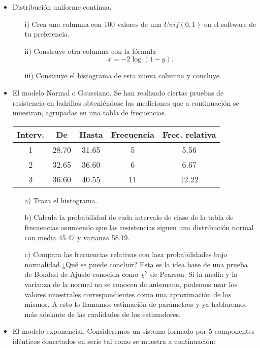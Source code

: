 \documentclass[11pt,letterpaper]{article}
\begin{document}
\begin{itemize}

\item Distribución uniforme continua.
\begin{itemize}
\item[i)] Crea una columna con 100 valores de una $Unif(0,1)$ en el software de tu preferencia.
\item[ii)] Construye otra columna con la fórmula $$x=-2\log(1-y).$$
\item[iii)] Construye el histograma de esta nueva columna y concluye.
\end{itemize} 

\item El modelo Normal o Gaussiano. Se han realizado ciertas pruebas de resistencia en ladrillos obteniéndose las mediciones que a continuación se muestran, agrupadas en una tabla de frecuencias.
\begin{table}[H]
\centering
\begin{tabular}{ccccc}
\hline
Interv. & De & Hasta & Frecuencia & Frec. relativa\\ \hline
1 & 28.70 & 31.65 & 5 & 5.56\\
2 & 32.65 & 36.60 & 6 & 6.67\\
3 & 36.60 & 40.55 &11 & 12.22\\
\hline
\end{tabular}
\end{table}
\begin{itemize}
\item[a)] Traza el histograma.
\item[b)] Calcula la probabilidad de cada intervalo de clase de la tabla de frecuencias asumiendo que las resistencias siguen una distribución normal con media 45.47 y varianza 58.19.
\item[c)] Compara las frecuencias relativas con lasa probabilidades bajo normalidad ¿Qué se puede concluir? Esta es la idea base de una prueba de Bondad de Ajuste conocida como $\chi^2$ de Pearson. Si la media y la varianza de la normal no se conocen de antemano, podemos usar los valores muestrales correspondientes como una aproximación de los mismos. A esto lo llamamos estimación de parámetros y ya hablaremos más adelante de las cualidades de los estimadores.
\end{itemize}

\item El modelo exponencial. Consideremos un sistema formado por 5 componentes idénticos conectados en serie tal como se muestra a continuación:


\end{itemize}
\end{document}
